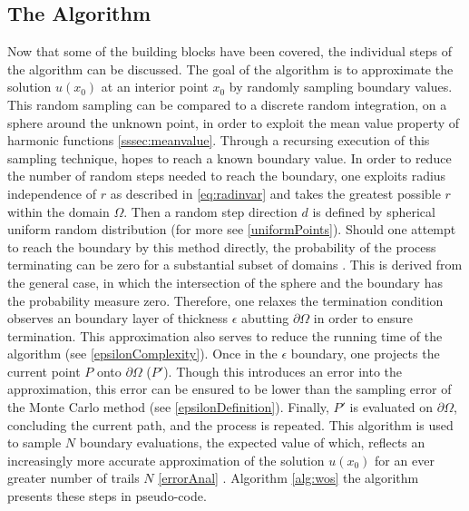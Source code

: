 \subsection{The Algorithm}\label{sssec:algorithm} %
Now that some of the building blocks have been covered, the individual steps of
the algorithm can be discussed.  The goal of the algorithm is to approximate
the solution $u(x_{0})$ at an interior point $x_{0}$ by randomly sampling boundary
values.  This random sampling can be compared to a discrete random integration,
on a sphere around the unknown point, in order to exploit the mean value property
of harmonic functions \ref{sssec:meanvalue}.  Through a recursing execution of this sampling
technique, hopes to reach a known boundary value.
In order to reduce the number of random steps needed to reach the boundary,
one exploits radius independence of $r$ as described in \eqref{eq:radinvar} and takes
the greatest possible $r$ within the domain $\Omega$.  Then a random step direction $d$
is defined by spherical uniform random distribution (for more see \ref{uniformPoints}).
Should one attempt to reach the boundary by this method directly, the probability of the
process terminating can be zero for a substantial subset of domains \cite{kakutani1944, DeLaurentis, Bornemann}.
This is derived from the general case, in which the intersection of the sphere and
the boundary has the probability measure zero. Therefore, one relaxes the
termination condition observes an boundary layer of thickness $\epsilon$ abutting
$\partial \Omega$ in order to ensure termination. This approximation also
serves to reduce the running time of the algorithm (see \ref{epsilonComplexity}). Once in the $\epsilon$
boundary, one projects the current point $P$ onto $\partial \Omega$ ($P'$).  Though this
introduces an error into the approximation, this error can be ensured to be lower than
the sampling error of the Monte Carlo method (see \ref{epsilonDefinition}).  Finally,
$P'$ is evaluated on $\partial \Omega$, concluding the current path, and the process
is repeated.
This algorithm is used to sample $N$ boundary evaluations, the expected value of which,
reflects an increasingly more accurate approximation of the solution $u(x_{0})$
for an ever greater number of trails $N$ \ref{errorAnal} \cite{Bornemann,DeLaurentis}.
  Algorithm \ref{alg:wos} the algorithm presents these steps in pseudo-code.
